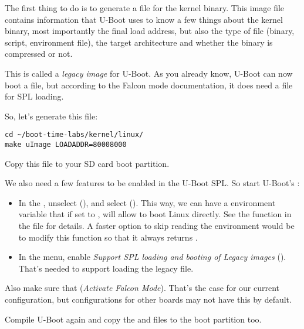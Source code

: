 The first thing to do is to generate a  file for the kernel
binary. This image file contains information that U-Boot uses to know a
few things about the kernel binary, most importantly the final load
address, but also the type of file (binary, script, environment file),
the target architecture and whether the binary is compressed or not.

This is called a {\em legacy image} for U-Boot. As you already know,
U-Boot can now boot a  file, but according to the Falcon
mode documentation, it does need a  file for SPL loading.

So, let's generate this file:
\begin{verbatim}
cd ~/boot-time-labs/kernel/linux/
make uImage LOADADDR=80008000
\end{verbatim}

Copy this  file to your SD card boot partition.

We also need a few features to be enabled in the U-Boot SPL. So start
U-Boot's :
\begin{itemize}
\item In the , unselect  (), and
      select 
      (). This way, we
      can have a  environment variable that if set to
      , will allow to boot Linux directly. See the
       function in the
       file for details. A
      faster option to skip reading the environment would be to
      modify this function so that it always returns .
\item In the  menu, enable {\em Support SPL loading
      and booting of Legacy images}
      ().
      That's needed to support loading the legacy  file.
\end{itemize}

Also make sure that 
({\em Activate Falcon Mode}).
That's the case for our current configuration, but configurations
for other boards may not have this by default.

Compile U-Boot again
and copy the  and  files to the boot
partition too.

